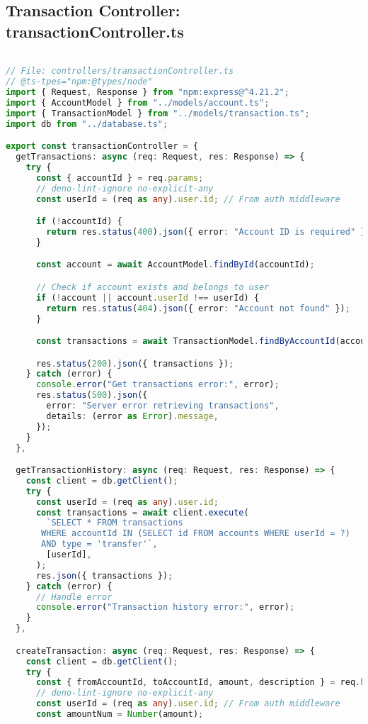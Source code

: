 \subsection{Transaction Controller: transactionController.ts}
\begin{lstlisting}[language=TypeScript]

// File: controllers/transactionController.ts
// @ts-tpes="npm:@types/node"
import { Request, Response } from "npm:express@^4.21.2";
import { AccountModel } from "../models/account.ts";
import { TransactionModel } from "../models/transaction.ts";
import db from "../database.ts";

export const transactionController = {
  getTransactions: async (req: Request, res: Response) => {
    try {
      const { accountId } = req.params;
      // deno-lint-ignore no-explicit-any
      const userId = (req as any).user.id; // From auth middleware

      if (!accountId) {
        return res.status(400).json({ error: "Account ID is required" });
      }

      const account = await AccountModel.findById(accountId);

      // Check if account exists and belongs to user
      if (!account || account.userId !== userId) {
        return res.status(404).json({ error: "Account not found" });
      }

      const transactions = await TransactionModel.findByAccountId(accountId);

      res.status(200).json({ transactions });
    } catch (error) {
      console.error("Get transactions error:", error);
      res.status(500).json({
        error: "Server error retrieving transactions",
        details: (error as Error).message,
      });
    }
  },

  getTransactionHistory: async (req: Request, res: Response) => {
    const client = db.getClient();
    try {
      const userId = (req as any).user.id;
      const transactions = await client.execute(
        `SELECT * FROM transactions
       WHERE accountId IN (SELECT id FROM accounts WHERE userId = ?)
       AND type = 'transfer'`,
        [userId],
      );
      res.json({ transactions });
    } catch (error) {
      // Handle error
      console.error("Transaction history error:", error);
    }
  },

  createTransaction: async (req: Request, res: Response) => {
    const client = db.getClient();
    try {
      const { fromAccountId, toAccountId, amount, description } = req.body;
      // deno-lint-ignore no-explicit-any
      const userId = (req as any).user.id; // From auth middleware
      const amountNum = Number(amount);



\end{lstlisting}
